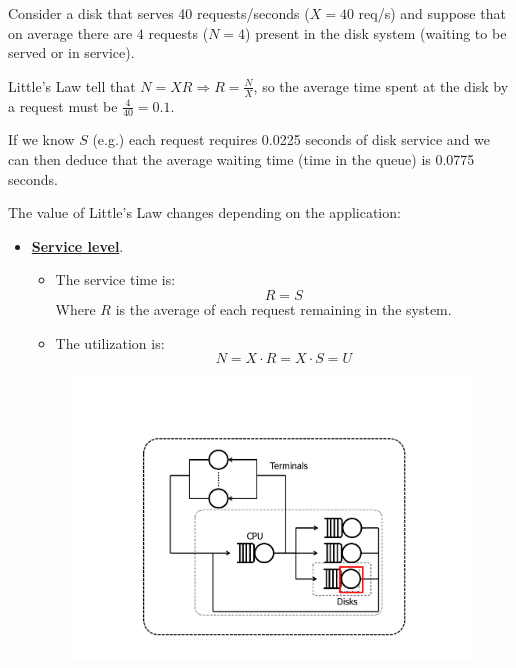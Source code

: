 \begin{examplebox}
	Consider a disk that serves 40 requests/seconds ($X = 40$ req/s) and suppose that on average there are $4$ requests ($N=4$) present in the disk system (waiting to be served or in service).
	
	Little's Law tell that $N = XR \Rightarrow R = \frac{N}{X}$, so the average time spent at the disk by a request must be $\frac{4}{40} = 0.1$.
	
	If we know $S$ (e.g.) each request requires 0.0225 seconds of disk service and we can then deduce that the average waiting time (time in the queue) is 0.0775 seconds.
\end{examplebox}
The value of Little's Law changes depending on the application:
\begin{itemize}
	\item \textbf{\underline{Service level}}.
	\begin{itemize}
		\item The service time is:
		\begin{equation*}
			R = S
		\end{equation*}
		Where $R$ is the average of each request remaining in the system.
		\item The utilization is:
		\begin{equation*}
			N = X \cdot R = X \cdot S = U
		\end{equation*}
	\end{itemize}
	\begin{figure}[!htp]
		\centering
		\includegraphics[width=.7\textwidth]{img/little-law-1.pdf}
	\end{figure}
	

\end{itemize}
